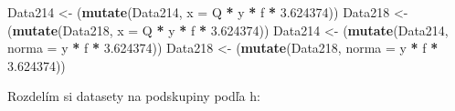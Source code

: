 \documentclass[]{article}
\newenvironment{Shaded}{\begin{snugshade}}{\end{snugshade}}
\newcommand{\DataTypeTok}[1]{\textcolor[rgb]{0.13,0.29,0.53}{#1}}
\newcommand{\FloatTok}[1]{\textcolor[rgb]{0.00,0.00,0.81}{#1}}
\newcommand{\KeywordTok}[1]{\textcolor[rgb]{0.13,0.29,0.53}{\textbf{#1}}}
\newcommand{\NormalTok}[1]{#1}
\newcommand{\OperatorTok}[1]{\textcolor[rgb]{0.81,0.36,0.00}{\textbf{#1}}}
\newcommand{\StringTok}[1]{\textcolor[rgb]{0.31,0.60,0.02}{#1}}
\begin{document}
\begin{Shaded}
\begin{Highlighting}[]
\NormalTok{Data214 <-}\StringTok{ }\NormalTok{(}\KeywordTok{mutate}\NormalTok{(Data214, }\DataTypeTok{x =}\NormalTok{ Q }\OperatorTok{*}\StringTok{ }\NormalTok{y }\OperatorTok{*}\StringTok{ }\NormalTok{f }\OperatorTok{*}\StringTok{ }\FloatTok{3.624374}\NormalTok{))}
\NormalTok{Data218 <-}\StringTok{ }\NormalTok{(}\KeywordTok{mutate}\NormalTok{(Data218, }\DataTypeTok{x =}\NormalTok{ Q }\OperatorTok{*}\StringTok{ }\NormalTok{y }\OperatorTok{*}\StringTok{ }\NormalTok{f }\OperatorTok{*}\StringTok{ }\FloatTok{3.624374}\NormalTok{))}
\NormalTok{Data214 <-}\StringTok{ }\NormalTok{(}\KeywordTok{mutate}\NormalTok{(Data214, }\DataTypeTok{norma =}\NormalTok{ y }\OperatorTok{*}\StringTok{ }\NormalTok{f }\OperatorTok{*}\StringTok{ }\FloatTok{3.624374}\NormalTok{))}
\NormalTok{Data218 <-}\StringTok{ }\NormalTok{(}\KeywordTok{mutate}\NormalTok{(Data218, }\DataTypeTok{norma =}\NormalTok{ y }\OperatorTok{*}\StringTok{ }\NormalTok{f }\OperatorTok{*}\StringTok{ }\FloatTok{3.624374}\NormalTok{))}
\end{Highlighting}
\end{Shaded}

Rozdelím si datasety na podskupiny podľa h:
\end{document}

